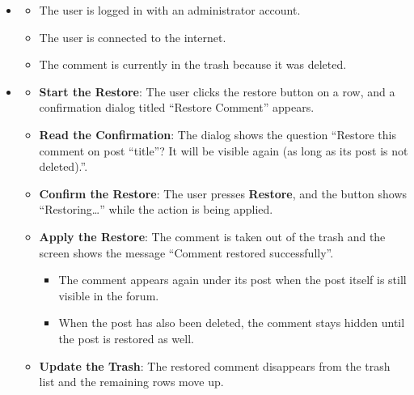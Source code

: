 
\begin{itemize}[leftmargin=1.6em,topsep=4pt,itemsep=3pt,parsep=0pt,label=$\bullet$]
    \item {}
        \begin{itemize}[leftmargin=2.2em,topsep=2pt,itemsep=3pt,parsep=0pt,label=$\circ$]
            \item The user is logged in with an administrator account.
            \item The user is connected to the internet.
            \item The comment is currently in the trash because it was deleted.
        \end{itemize}
    \item {}
        \begin{itemize}[leftmargin=2.2em,topsep=2pt,itemsep=3pt,parsep=0pt,label=$\circ$]
            \item \textbf{Start the Restore}: The user clicks the restore button on a row, and a confirmation dialog titled ``Restore Comment'' appears.
            \item \textbf{Read the Confirmation}: The dialog shows the question ``Restore this comment on post ``title''? It will be visible again (as long as its post is not deleted).''.
            \item \textbf{Confirm the Restore}: The user presses \textbf{Restore}, and the button shows ``Restoring\dots'' while the action is being applied.
            \item \textbf{Apply the Restore}: The comment is taken out of the trash and the screen shows the message ``Comment restored successfully''.
                \begin{itemize}[leftmargin=2.2em,topsep=2pt,itemsep=3pt,parsep=0pt,label=$\blacksquare$]
                    \item The comment appears again under its post when the post itself is still visible in the forum.
                    \item When the post has also been deleted, the comment stays hidden until the post is restored as well.
                \end{itemize}
            \item \textbf{Update the Trash}: The restored comment disappears from the trash list and the remaining rows move up.

\end{itemize}
\end{itemize}
